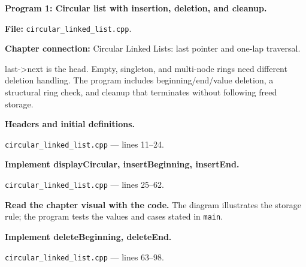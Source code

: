 \textbf{Program 1: Circular list with insertion, deletion, and cleanup.}

\textbf{File:} \texttt{circular\_linked\_list.cpp}.

\textbf{Chapter connection:} Circular Linked Lists: last pointer and one-lap traversal.

last->next is the head. Empty, singleton, and multi-node rings need different deletion handling. The program includes beginning/end/value deletion, a structural ring check, and cleanup that terminates without following freed storage.



\begin{utpsteps}\setcounter{enumi}{0}\item \textbf{Headers and initial definitions.}\end{utpsteps}

\texttt{circular\_linked\_list.cpp} --- lines 11--24.




\tcbbreak

\begin{utpsteps}\setcounter{enumi}{1}\item \textbf{Implement displayCircular, insertBeginning, insertEnd.}\end{utpsteps}

\texttt{circular\_linked\_list.cpp} --- lines 25--62.

\textbf{Read the chapter visual with the code.} The diagram illustrates the storage rule; the program tests the values and cases stated in \texttt{main}.





\tcbbreak

\begin{utpsteps}\setcounter{enumi}{2}\item \textbf{Implement deleteBeginning, deleteEnd.}\end{utpsteps}

\texttt{circular\_linked\_list.cpp} --- lines 63--98.






\tcbbreak

